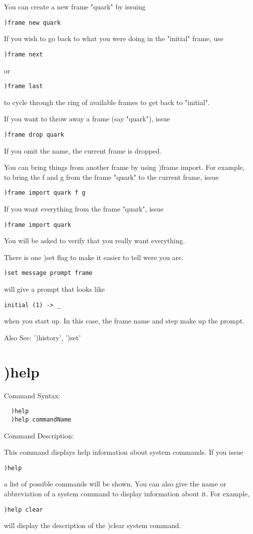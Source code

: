 You can create a new frame "quark" by issuing
\begin{verbatim}
)frame new quark
\end{verbatim}
If you wish to go back to what you were doing in the "initial" frame, use
\begin{verbatim}
)frame next
\end{verbatim}
or
\begin{verbatim}
)frame last
\end{verbatim}
to cycle through the ring of available frames to get back to "initial".

If you want to throw away a frame (say "quark"), issue
\begin{verbatim}
)frame drop quark
\end{verbatim}
If you omit the name, the current frame is dropped.

You can bring things from another frame by using )frame import. For example, to bring the f and g from the frame "quark" to the current frame, issue
\begin{verbatim}
)frame import quark f g
\end{verbatim}
If you want everything from the frame "quark", issue
\begin{verbatim}
)frame import quark
\end{verbatim}
You will be asked to verify that you really want everything.

There is one )set flag to make it easier to tell were you are.
\begin{verbatim}
)set message prompt frame
\end{verbatim}
will give a prompt that looks like
\begin{verbatim}
initial (1) -> _
\end{verbatim}
when you start up. In this case, the frame name and step make up the prompt.

Also See: ')history', ')set'

\section{)help}

Command Syntax:
\begin{verbatim}
  )help
  )help commandName
\end{verbatim}
Command Description:

This command displays help information about system commands. If you issue
\begin{verbatim}
)help
\end{verbatim}
a list of possible commands will be shown. You can also give the name or abbreviation of a system command to display information about it. For example,
\begin{verbatim}
)help clear
\end{verbatim}
will display the description of the )clear system command.

